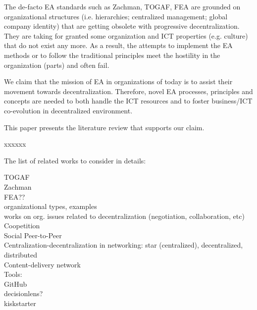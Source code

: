 The de-facto EA standards such as Zachman, TOGAF, FEA are grounded on organizational structures (i.e. hierarchies; centralized management; global company identity) that are getting obsolete with progressive decentralization. They are taking for granted some organization and ICT properties (e.g. culture) that do not exist any more. As a result, the attempts to implement the EA methods or to follow the traditional principles meet the hostility in the organization (parts) and often fail.

We claim that the mission of EA in organizations of today is to assist their movement towards decentralization. Therefore, novel EA processes, principles and concepts are needed to both handle the ICT resources and to foster business/ICT co-evolution in decentralized environment.

This paper presents the literature review that supports our claim. 

xxxxxx


The list of related works to consider in details:

TOGAF \\
Zachman \\
FEA?? \\
organizational types, examples  \\
works on org. issues related to decentralization (negotiation, collaboration, etc) \\
Coopetition\\
Social Peer-to-Peer \\
Centralization-decentralization in networking: star (centralized), decentralized, distributed \\
Content-delivery network \\
Tools: \\
GitHub \\
decisionlens?\\
kiskstarter\\

% 
% 
% 
% 
% 
% 
% 
% 
% 
% 
% 
% 
% 
% 
% 
% 
% 
